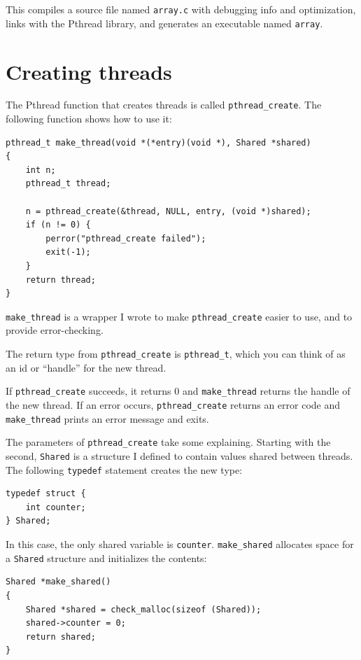 \documentclass[12pt]{book}
\begin{document}
This compiles a source file named {\tt array.c} with debugging info
and optimization, links with the Pthread library, and generates an
executable named {\tt array}.


\section{Creating threads}

The Pthread function that creates threads is called \verb"pthread_create".
The following function shows how to use it:

\begin{verbatim}
pthread_t make_thread(void *(*entry)(void *), Shared *shared)
{
    int n;
    pthread_t thread;

    n = pthread_create(&thread, NULL, entry, (void *)shared);
    if (n != 0) {
        perror("pthread_create failed");
        exit(-1);
    }
    return thread;
}
\end{verbatim}

\verb"make_thread" is a wrapper I wrote to make
\verb"pthread_create" easier to use, and to provide error-checking.


The return type from \verb"pthread_create" is \verb"pthread_t",
which you can think of as an id or ``handle'' for the new thread.  

If {\tt pthread\_create} succeeds, it returns 0 and \verb"make_thread"
returns the handle of the new thread.
If an error occurs, {\tt pthread\_create} 
returns an error code and \verb"make_thread" prints an error message
and exits.

The parameters of {\tt pthread\_create} take some
explaining.  Starting with the second, {\tt Shared}
is a structure I defined to contain values shared between threads.
The following {\tt typedef} statement creates the new type:

\begin{verbatim}
typedef struct {
    int counter;
} Shared;
\end{verbatim}

In this case, the only shared variable is {\tt counter}.
{\tt make\_shared} allocates
space for a {\tt Shared} structure and initializes the contents:

\begin{verbatim}
Shared *make_shared()
{
    Shared *shared = check_malloc(sizeof (Shared));
    shared->counter = 0;
    return shared;
}
\end{verbatim}
\end{document}
